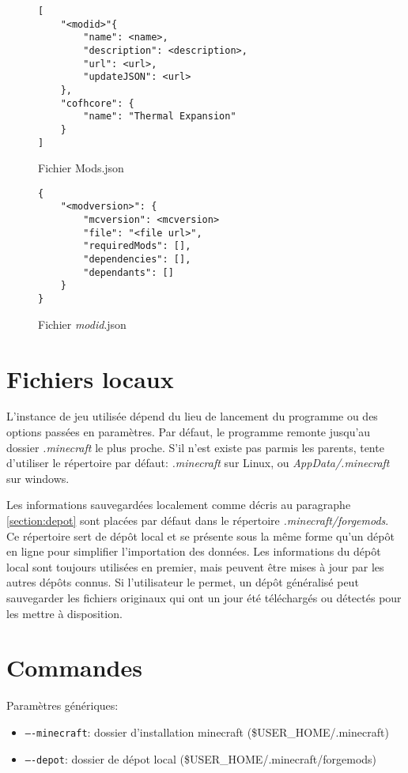 \documentclass{article}
\begin{document}
\begin{figure}
\centering
\begin{verbatim}
[
    "<modid>"{
        "name": <name>,
        "description": <description>,
        "url": <url>,
        "updateJSON": <url>
    },
    "cofhcore": {
        "name": "Thermal Expansion"
    }
]
\end{verbatim}
\caption{Fichier Mods.json}
\label{figure:mods.json}
\end{figure}

\begin{figure}
\begin{verbatim}
{
    "<modversion>": {
        "mcversion": <mcversion>
        "file": "<file url>",
        "requiredMods": [],
        "dependencies": [],
        "dependants": []
    }
}
\end{verbatim}
\caption{Fichier \textit{modid}.json}
\label{figure:modid.json}
\end{figure}


\section{Fichiers locaux}
L'instance de jeu utilisée dépend du lieu de lancement du programme ou des options passées en paramètres.
Par défaut, le programme remonte jusqu'au dossier \textit{.minecraft} le plus proche.
S'il n'est existe pas parmis les parents, tente d'utiliser le répertoire par défaut: \textit{.minecraft} sur Linux, ou \textit{AppData/.minecraft} sur windows.

Les informations sauvegardées localement comme décris au paragraphe \ref{section:depot} sont placées par défaut dans le répertoire \textit{.minecraft/forgemods}.
Ce répertoire sert de dépôt local et se présente sous la même forme qu'un dépôt en ligne pour simplifier l'importation des données.
Les informations du dépôt local sont toujours utilisées en premier, mais peuvent être mises à jour par les autres dépôts connus.
Si l'utilisateur le permet, un dépôt généralisé peut sauvegarder les fichiers originaux qui ont un jour été téléchargés ou détectés pour les mettre à disposition.


\section{Commandes}
Paramètres génériques:
\begin{itemize}
    \item \texttt{----minecraft}: dossier d'installation minecraft (\$USER\_HOME/.minecraft)
    \item \texttt{----depot}: dossier de dépot local (\$USER\_HOME/.minecraft/forgemods)
\end{itemize}
\end{document}
